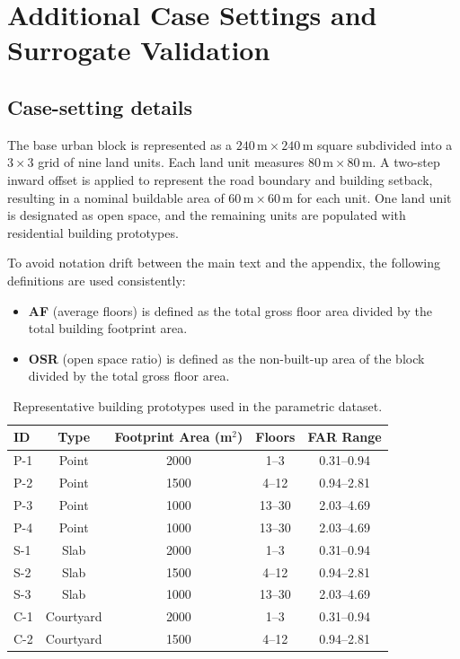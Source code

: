 \appendix

\section{Additional Case Settings and Surrogate Validation}

\subsection{Case-setting details}

The base urban block is represented as a $240\,\mathrm{m}\times240\,\mathrm{m}$ square subdivided into a $3\times3$ grid of nine land units. Each land unit measures $80\,\mathrm{m}\times80\,\mathrm{m}$. A two-step inward offset is applied to represent the road boundary and building setback, resulting in a nominal buildable area of $60\,\mathrm{m}\times60\,\mathrm{m}$ for each unit. One land unit is designated as open space, and the remaining units are populated with residential building prototypes.

To avoid notation drift between the main text and the appendix, the following definitions are used consistently:
\begin{itemize}
\item \textbf{AF} (average floors) is defined as the total gross floor area divided by the total building footprint area.
\item \textbf{OSR} (open space ratio) is defined as the non-built-up area of the block divided by the total gross floor area.
\end{itemize}

\begin{table}[H]
\centering
\caption{Representative building prototypes used in the parametric dataset.}
\begin{threeparttable}
\begin{tabular*}{\linewidth}{@{\extracolsep{\fill}}lcccc@{}}
\toprule
ID & Type & Footprint Area (m$^2$) & Floors & FAR Range \\
\midrule
P-1 & Point      & 2000 & 1--3   & 0.31--0.94 \\
P-2 & Point      & 1500 & 4--12  & 0.94--2.81 \\
P-3 & Point      & 1000 & 13--30 & 2.03--4.69 \\
P-4 & Point      & 1000 & 13--30 & 2.03--4.69 \\
S-1 & Slab       & 2000 & 1--3   & 0.31--0.94 \\
S-2 & Slab       & 1500 & 4--12  & 0.94--2.81 \\
S-3 & Slab       & 1000 & 13--30 & 2.03--4.69 \\
C-1 & Courtyard  & 2000 & 1--3   & 0.31--0.94 \\
C-2 & Courtyard  & 1500 & 4--12  & 0.94--2.81 \\
\bottomrule
\end{tabular*}
\end{threeparttable}
\end{table}


